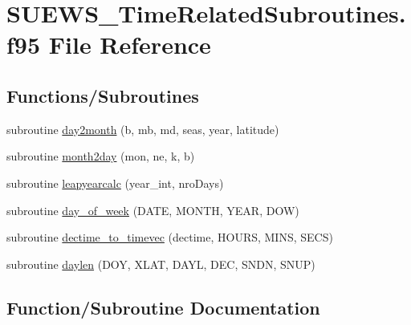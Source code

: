 \hypertarget{_s_u_e_w_s___time_related_subroutines_8f95}{}\section{S\+U\+E\+W\+S\+\_\+\+Time\+Related\+Subroutines.\+f95 File Reference}
\label{_s_u_e_w_s___time_related_subroutines_8f95}
\subsection*{Functions/\+Subroutines}
\begin{DoxyCompactItemize}
\item 
subroutine \hyperlink{_s_u_e_w_s___time_related_subroutines_8f95_accca788adc351c09ee533486e596087f}{day2month} (b, mb, md, seas, year, latitude)
\item 
subroutine \hyperlink{_s_u_e_w_s___time_related_subroutines_8f95_afdee38b1c29d0a50a81cd92530f44dd4}{month2day} (mon, ne, k, b)
\item 
subroutine \hyperlink{_s_u_e_w_s___time_related_subroutines_8f95_a588412655d85d00760c060237b7d6675}{leapyearcalc} (year\+\_\+int, nro\+Days)
\item 
subroutine \hyperlink{_s_u_e_w_s___time_related_subroutines_8f95_a6159824d400b46f56440f07f15e9dca6}{day\+\_\+of\+\_\+week} (D\+A\+TE, M\+O\+N\+TH, Y\+E\+AR, D\+OW)
\item 
subroutine \hyperlink{_s_u_e_w_s___time_related_subroutines_8f95_ae44eae3097f823efa27d37cb4bdf1a1c}{dectime\+\_\+to\+\_\+timevec} (dectime, H\+O\+U\+RS, M\+I\+NS, S\+E\+CS)
\item 
subroutine \hyperlink{_s_u_e_w_s___time_related_subroutines_8f95_aa942778e50079323e7fb7ede6f63ebce}{daylen} (D\+OY, X\+L\+AT, D\+A\+YL, D\+EC, S\+N\+DN, S\+N\+UP)
\end{DoxyCompactItemize}


\subsection{Function/\+Subroutine Documentation}
\mbox{\label{_s_u_e_w_s___time_related_subroutines_8f95_accca788adc351c09ee533486e596087f}} 
